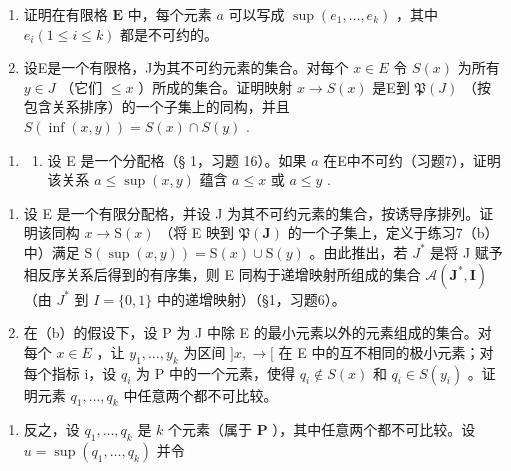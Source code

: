 \begin{enumerate}
\def\labelenumi{(\alph{enumi})}
\item
  证明在有限格 \(\mathbf{E}\) 中，每个元素 \(a\) 可以写成 \(\sup (e_1, \ldots, e_k)\) ，其中 \(e_i (1 \leqslant i \leqslant k)\) 都是不可约的。
\item
  设E是一个有限格，J为其不可约元素的集合。对每个 \(x \in E\) 令 \(S(x)\) 为所有 \(y \in J\) （它们 \(\leqslant x\) ）所成的集合。证明映射 \(x \to S(x)\) 是E到 \(\mathfrak{P}(J)\) （按包含关系排序）的一个子集上的同构，并且 \(S(\inf(x, y)) = S(x) \cap S(y)\) .
\end{enumerate}

\begin{enumerate}
\def\labelenumi{\arabic{enumi}.}
\setcounter{enumi}{7}
\tightlist
\item
  \begin{enumerate}
  \def\labelenumii{(\alph{enumii})}
  \tightlist
  \item
    设 E 是一个分配格（§ 1，习题 16）。如果 \(a\) 在E中不可约（习题7），证明该关系 \(a \leqslant \sup (x, y)\) 蕴含 \(a \leqslant x\) 或 \(a \leqslant y\) .
  \end{enumerate}
\end{enumerate}

\begin{enumerate}
\def\labelenumi{(\alph{enumi})}
\setcounter{enumi}{1}
\item
  设 E 是一个有限分配格，并设 J 为其不可约元素的集合，按诱导序排列。证明该同构 \(x \to \mathrm{S}(x)\) （将 E 映到 \(\mathfrak{P}(\mathbf{J})\) 的一个子集上，定义于练习7（b）中）满足 \(\mathrm{S}(\sup(x,y)) = \mathrm{S}(x) \cup \mathrm{S}(y)\) 。由此推出，若 \(J^{*}\) 是将 J 赋予相反序关系后得到的有序集，则 E 同构于递增映射所组成的集合 \(\mathcal{A}(\mathbf{J}^{*}, \mathbf{I})\) （由 \(J^{*}\) 到 \(I = \{0, 1\}\) 中的递增映射）（§1，习题6）。
\item
  在（b）的假设下，设 P 为 J 中除 E 的最小元素以外的元素组成的集合。对每个 \(x \in E\) ，让 \(y_{1}, \ldots, y_{k}\) 为区间 \(]x, \rightarrow[\) 在 E 中的互不相同的极小元素；对每个指标 i，设 \(q_{i}\) 为 P 中的一个元素，使得 \(q_{i} \notin S(x)\) 和 \(q_{i} \in S(y_{i})\) 。证明元素 \(q_{1}, \ldots, q_{k}\) 中任意两个都不可比较。
\end{enumerate}

\begin{enumerate}
\def\labelenumi{(\alph{enumi})}
\setcounter{enumi}{3}
\tightlist
\item
  反之，设 \(q_1, \ldots, q_k\) 是 \(k\) 个元素（属于 \(\mathbf{P}\) ），其中任意两个都不可比较。设 \(u = \sup (q_1, \ldots, q_k)\) 并令
\end{enumerate}

